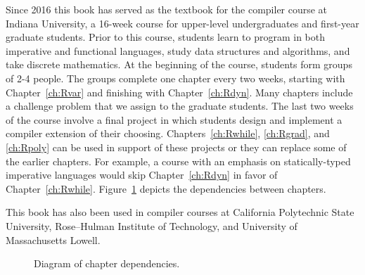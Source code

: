 \documentclass[7x10]{TimesAPriori_MIT}%
\begin{document}
Since 2016 this book has served as the textbook for the compiler
course at Indiana University, a 16-week course for upper-level
undergraduates and first-year graduate students.
%
Prior to this course, students learn to program in both imperative and
functional languages, study data structures and algorithms, and take
discrete mathematics.
%
At the beginning of the course, students form groups of 2-4 people.
The groups complete one chapter every two weeks, starting with
Chapter~\ref{ch:Rvar} and finishing with Chapter~\ref{ch:Rdyn}. Many
chapters include a challenge problem that we assign to the graduate
students. The last two weeks of the course involve a final project in
which students design and implement a compiler extension of their
choosing.  Chapters~\ref{ch:Rwhile}, \ref{ch:Rgrad}, and
\ref{ch:Rpoly} can be used in support of these projects or they can
replace some of the earlier chapters. For example, a course with an
emphasis on statically-typed imperative languages would skip
Chapter~\ref{ch:Rdyn} in favor of
Chapter~\ref{ch:Rwhile}. Figure~\ref{fig:chapter-dependences} depicts
the dependencies between chapters.

This book has also been used in compiler courses at California
Polytechnic State University, Rose–Hulman Institute of Technology, and
University of Massachusetts Lowell.


\begin{figure}[tp]
  \caption{Diagram of chapter dependencies.}
  \label{fig:chapter-dependences}
\end{figure}
\end{document}
